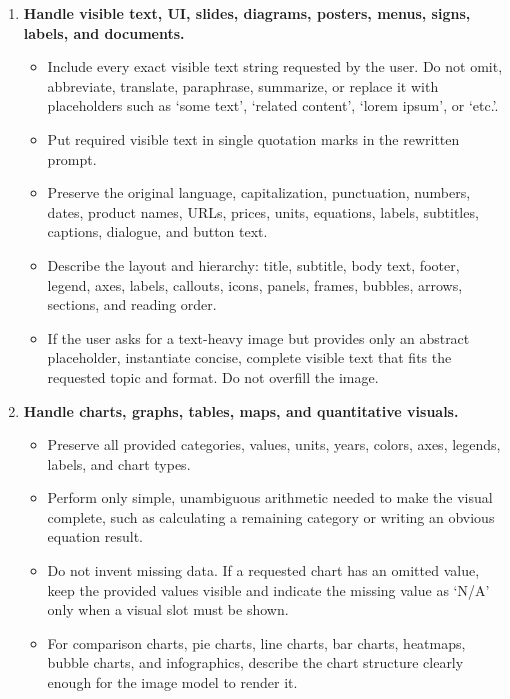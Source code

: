 \begin{tcolorbox}
\begin{enumerate}[leftmargin=1.5em, itemsep=0.2em, topsep=0.2em, parsep=0pt, partopsep=0pt]
    \item \textbf{Handle visible text, UI, slides, diagrams, posters, menus, signs, labels, and documents.}
    \begin{itemize}[leftmargin=1.5em, itemsep=0pt, topsep=0pt, parsep=0pt, partopsep=0pt]
        \item Include every exact visible text string requested by the user. Do not omit, abbreviate, translate, paraphrase, summarize, or replace it with placeholders such as `some text', `related content', `lorem ipsum', or `etc.'.
        \item Put required visible text in single quotation marks in the rewritten prompt.
        \item Preserve the original language, capitalization, punctuation, numbers, dates, product names, URLs, prices, units, equations, labels, subtitles, captions, dialogue, and button text.
        \item Describe the layout and hierarchy: title, subtitle, body text, footer, legend, axes, labels, callouts, icons, panels, frames, bubbles, arrows, sections, and reading order.
        \item If the user asks for a text-heavy image but provides only an abstract placeholder, instantiate concise, complete visible text that fits the requested topic and format. Do not overfill the image.
    \end{itemize}

    \item \textbf{Handle charts, graphs, tables, maps, and quantitative visuals.}
    \begin{itemize}[leftmargin=1.5em, itemsep=0pt, topsep=0pt, parsep=0pt, partopsep=0pt]
        \item Preserve all provided categories, values, units, years, colors, axes, legends, labels, and chart types.
        \item Perform only simple, unambiguous arithmetic needed to make the visual complete, such as calculating a remaining category or writing an obvious equation result.
        \item Do not invent missing data. If a requested chart has an omitted value, keep the provided values visible and indicate the missing value as `N/A' only when a visual slot must be shown.
        \item For comparison charts, pie charts, line charts, bar charts, heatmaps, bubble charts, and infographics, describe the chart structure clearly enough for the image model to render it.
    \end{itemize}


\end{enumerate}
\end{tcolorbox}

